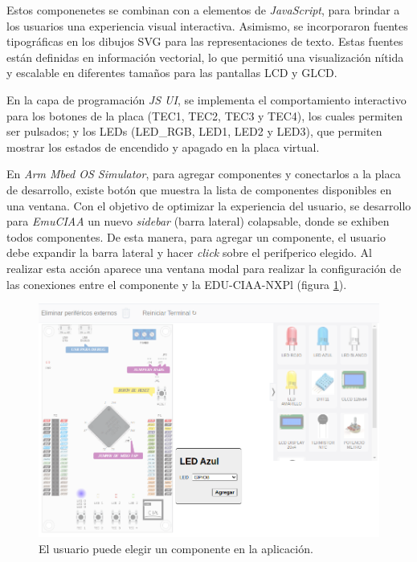 Estos componenetes se combinan con a elementos de \textit{JavaScript}, para brindar a los usuarios una experiencia visual interactiva. Asimismo, se incorporaron fuentes tipográficas en los dibujos SVG para las representaciones de texto. Estas fuentes están definidas en información vectorial, lo que permitió una visualización nítida y escalable en diferentes tamaños para las pantallas LCD y GLCD.

En la capa de programación \textit{JS UI}, se implementa el comportamiento interactivo para los botones de la placa (TEC1, TEC2, TEC3 y TEC4), los cuales permiten ser pulsados; y los LEDs (LED\_RGB, LED1, LED2 y LED3), que permiten mostrar los estados de encendido y apagado en la placa virtual.

En \textit{Arm Mbed OS Simulator}, para agregar componentes y conectarlos a la placa de desarrollo, existe botón que muestra la lista de componentes disponibles en una ventana. Con el objetivo de optimizar la experiencia del usuario, se desarrollo para \textit{EmuCIAA} un nuevo \textit{sidebar} (barra lateral) colapsable, donde se exhiben todos componentes. De esta manera, para agregar un componente, el usuario debe expandir la barra lateral y hacer \textit{click} sobre el perifperico elegido. Al realizar esta acción aparece una ventana modal para realizar la configuración de las conexiones entre el componente y la EDU-CIAA-NXPl (figura \ref{fig:AgregarPeriferico}). 

\begin{figure}[ht]
	\centering
	\includegraphics[scale=.37]{./Figures/AgregarPeriferico.png}
	\caption{El usuario puede elegir un componente en la aplicación.}
	\label{fig:AgregarPeriferico}
\end{figure}

